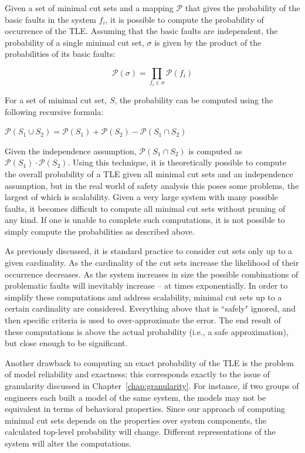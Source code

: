 Given a set of minimal cut sets and a mapping $\mathcal{P}$ that gives the probability of the basic faults in the system $f_i$, it is possible to compute the probability of occurrence of the TLE. Assuming that the basic faults are independent, the probability of a single minimal cut set, $\sigma$ is given by the product of the probabilities of its basic faults:
\begin{center}
    \begin{equation*}\mathcal{P}(\sigma) = \prod_{f_i \in \sigma} \mathcal{P}(f_i) 
    \end{equation*}    
\end{center}

For a set of minimal cut set, $S$, the probability can be computed using the following recursive formula:

\begin{center}
    $\mathcal{P}(S_1 \cup S_2) = \mathcal{P}(S_1) + \mathcal{P}(S_2) - \mathcal{P}(S_1 \cap S_2)$
\end{center}

Given the independence assumption, $\mathcal{P}(S_1 \cap S_2)$ is computed as $\mathcal{P}(S_1) \cdot   \mathcal{P}(S_2)$. Using this technique, it is theoretically possible to compute the overall probability of a TLE given all minimal cut sets and an independence assumption, but in the real world of safety analysis this poses some problems, the largest of which is scalability. Given a very large system with many possible faults, it becomes difficult to compute all minimal cut sets without pruning of any kind. If one is unable to complete such computations, it is not possible to simply compute the probabilities as described above. 

As previously discussed, it is standard practice to consider cut sets only up to a given cardinality. As the cardinality of the cut sets increase the likelihood of their occurrence decreases. As the system increases in size the possible combinations of problematic faults will inevitably increase -- at times exponentially. In order to simplify these computations and address scalability, minimal cut sets up to a certain cardinality are considered. Everything above that is ``safely" ignored, and then specific criteria is used to over-approximate the error. The end result of these computations is above the actual probability (i.e., a safe approximation), but close enough to be significant. 

Another drawback to computing an exact probability of the TLE is the problem of model reliability and exactness; this corresponds exactly to the issue of granularity discussed in Chapter~\ref{chap:granularity}. For instance, if two groups of engineers each built a model of the same system, the models may not be equivalent in terms of behavioral properties. Since our approach of computing minimal cut sets depends on the properties over system components, the calculated top-level probability will change. Different representations of the system will alter the computations.  

